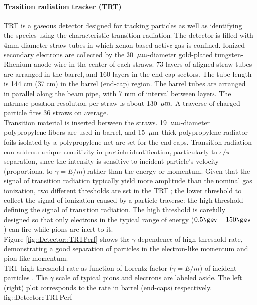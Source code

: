 \clearpage
\paragraph{Trasition radiation tracker (TRT)}
TRT is a gaseous detector designed for tracking particles as well as identifying the species using the characteristic transition radiation.
The detector is filled with 4mm-diameter straw tubes in which xenon-based active gas is confined.
Ionized secondary electrons are collected by the 30 $\, \mathrm{\mu m}$-diameter gold-plated tungsten-Rhenium anode wire in the center of each straws.
73 layers of aligned straw tubes are arranged in the barrel, and 160 layers in the end-cap sectors. 
The tube length is 144 cm (37 cm) in the barrel (end-cap) region. 
The barrel tubes are arranged in parallel along the beam pipe, with 7 mm of interval between layers.
The intrinsic position resolution per straw is about 130 $\, \mathrm{\mu m}$.
A traverse of charged particle fires 36 straws on average. \\

Transition material is inserted between the straws.
19 $\, \mathrm{\mu m}$-diameter polypropylene fibers are used in barrel, and 15 $\, \mathrm{\mu m}$-thick polypropylene radiator foils isolated by a polypropylene net are set for the end-caps.
Transition radiation can address unique sensitivity in particle identification, particularly to  $e/\pi$ separation, 
since the intensity is sensitive to incident particle's velocity (proportional to $\gamma=E/m$) rather than the energy or momentum. 
Given that the signal of transition radiation typically yield more amplitude than the nominal gas ionization, two different thresholds are set in the TRT ; 
the lower threshold to collect the signal of ionization caused by a particle traverse; the high threshold defining the signal of transition radiation. 
The high threshold is carefully designed so that only electrons in the typical range of energy ($0.5\gev - 150 \gev$) can fire while pions are inert to it. \\

Figure \ref{fig::Detector::TRTPerf} shows the $\gamma$-dependence of high threshold rate, demonstrating a good separation of particles in the electron-like momentum and pion-like momentum. \\

{TRT high threshold rate as function of Lorentz factor ($\gamma=E/m$) of incident particles \cite{TRTPub}.
The $\gamma$ scale of typical pions and electrons are labeled aside. The left (right) plot corresponds to the rate in barrel (end-caps) respectively.}
{fig::Detector::TRTPerf}


